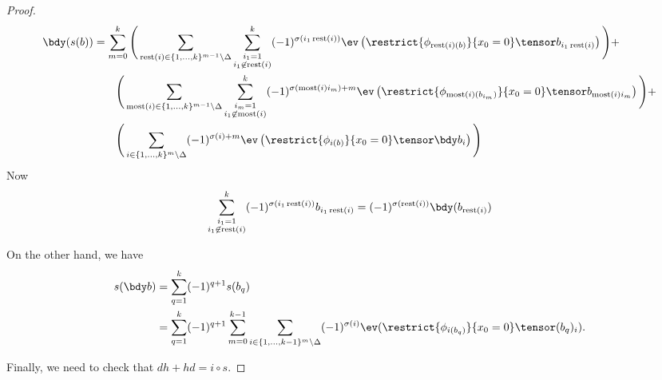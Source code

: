\begin{proof}
\begin{align*}
\bdy(s(b)) & = \sum_{m=0}^{k} \Bigg( \sum_{\rest(i) \in \{1, \ldots, k\}^{m-1} \setminus \Delta} \sum_{\substack{i_1 = 1 \\ i_1 \not\in \rest(i)}}^{k}  (-1)^{\sigma(i_1\rest(i))} \ev\left(\restrict{\phi_{\rest(i)(b)}}{x_0 = 0}\tensor b_{i_1\rest(i)}\right) \Bigg)+ \\
	& \qquad \Bigg( \sum_{\most(i) \in \{1, \ldots, k\}^{m-1} \setminus \Delta} \sum_{\substack{i_m = 1 \\ i_1 \not\in \most(i)}}^{k}  (-1)^{\sigma(\most(i) i_m) + m} \ev\left(\restrict{\phi_{\most(i)(b_{i_m})}}{x_0 = 0}\tensor b_{\most(i) i_m}\right)\Bigg) + \\
	& \qquad \Bigg( \sum_{i \in \{1, \ldots, k\}^{m} \setminus \Delta} (-1)^{\sigma(i) + m} \ev\left(\restrict{\phi_{i(b)}}{x_0 = 0} \tensor \bdy b_i\right)\Bigg)
\end{align*}
Now $$\sum_{\substack{i_1 = 1 \\ i_1 \not\in \rest(i)}}^{k} (-1)^{\sigma(i_1\rest(i))} b_{i_1\rest(i)} = (-1)^{\sigma(\rest(i))} \bdy (b_{\rest(i)})$$


On the other hand, we have
\begin{align*}
s(\bdy b) & = \sum_{q=1}^k (-1)^{q+1} s(b_q) \\
	       & = \sum_{q=1}^k (-1)^{q+1} \sum_{m=0}^{k-1} \sum_{i \in \{1, \ldots, k-1\}^{m} \setminus \Delta} (-1)^{\sigma(i)}  \ev(\restrict{\phi_{i(b_q)}}{x_0 = 0} \tensor (b_q)_i).
\end{align*}

Finally, we need to check that $dh+hd=i\circ s$. \todo{}
\end{proof}
